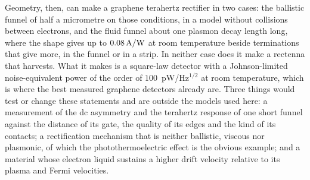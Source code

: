 Geometry, then, can make a graphene terahertz rectifier in two cases: the
ballistic funnel of half a micrometre on those conditions, in a model
without collisions between electrons, and the fluid funnel about one
plasmon decay length long, where the shape gives up to $0.08\,\mathrm{A/W}$ at room
temperature beside terminations that give more, in the funnel or in a
strip. In neither case does it make a rectenna that harvests. What it
makes is a square-law detector with a Johnson-limited noise-equivalent
power of the order of $100$~pW/Hz$^{1/2}$ at room temperature, which is
where the best measured graphene detectors already are. Three things
would test or change these statements and are outside the models used
here: a measurement of the dc asymmetry and the terahertz response of one
short funnel against the distance of its gate, the quality of its edges
and the kind of its contacts; a rectification mechanism that is neither
ballistic, viscous nor plasmonic, of which the photothermoelectric effect
is the obvious example; and a material whose electron liquid sustains a
higher drift velocity relative to its plasma and Fermi velocities.
